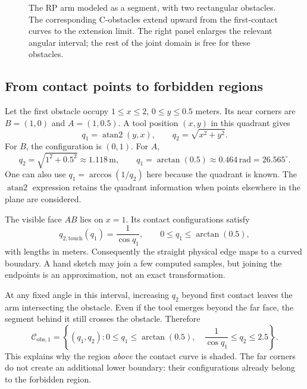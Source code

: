 \begin{figure}[htbp]
\centering
\caption{The RP arm modeled as a segment, with two rectangular obstacles.
The corresponding C-obstacles extend upward from the first-contact curves
to the extension limit. The right panel enlarges the relevant angular
interval; the rest of the joint domain is free for these obstacles.}
\label{fig:l13-rp}
\end{figure}

\subsection{From contact points to forbidden regions}
Let the first obstacle occupy $1\le x\le2$, $0\le y\le0.5$ meters.
Its near corners are $B=(1,0)$ and $A=(1,0.5)$. A tool position $(x,y)$
in this quadrant gives
\[
 q_1=\operatorname{atan2}(y,x),\qquad q_2=\sqrt{x^2+y^2}.
\]
For $B$, the configuration is $(0,1)$. For $A$,
\[
 q_2=\sqrt{1^2+0.5^2}\approx1.118\,\mathrm m,\qquad
 q_1=\arctan(0.5)\approx0.464\,\mathrm{rad}=26.565^\circ.
\]
One can also use $q_1=\arccos(1/q_2)$ here because the quadrant is known.
The $\operatorname{atan2}$ expression retains the quadrant information
when points elsewhere in the plane are considered.

The visible face $AB$ lies on $x=1$. Its contact configurations satisfy
\begin{equation}
 q_{2,\mathrm{touch}}(q_1)=\frac{1}{\cos q_1},\qquad
 0\le q_1\le\arctan(0.5),
 \label{eq:l13-first}
\end{equation}
with lengths in meters. Consequently the straight physical edge maps to
a curved boundary. A hand sketch may join a few computed samples, but
joining the endpoints is an approximation, not an exact transformation.

At any fixed angle in this interval, increasing $q_2$ beyond first contact
leaves the arm intersecting the obstacle. Even if the tool emerges beyond
the far face, the segment behind it still crosses the obstacle. Therefore
\begin{equation}
 \mathcal C_{\mathrm{obs},1}=
 \left\{(q_1,q_2):0\le q_1\le\arctan(0.5),\quad
 \frac{1}{\cos q_1}\le q_2\le2.5\right\}.
 \label{eq:l13-cobs1}
\end{equation}
This explains why the region \emph{above} the contact curve is shaded.
The far corners do not create an additional lower boundary: their
configurations already belong to the forbidden region.

